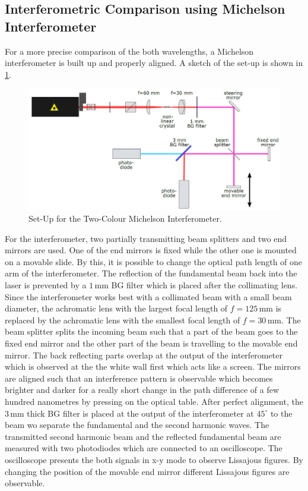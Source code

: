 \documentclass[10pt, a4paper, notitlepage, DIV=15]{scrartcl}
\begin{document}
\subsection{Interferometric Comparison using Michelson Interferometer}
For a more precise comparison of the both wavelengths, a Michelson interferometer is built up and properly aligned. A sketch of the set-up is shown in \ref{fig:michelson}.
\begin{figure}[h]
	\centering
	\includegraphics[width=1.05\textwidth]{michelson}
	\caption{Set-Up for the Two-Colour Michelson Interferometer. \cite{description}}
	\label{fig:michelson}
\end{figure}
\newline
For the interferometer, two partially transmitting beam splitters and two end mirrors are used. One of the end mirrors is fixed while the other one is mounted on a movable slide. By this, it is possible to change the optical path length of one arm of the interferometer. The reflection of the fundamental beam back into the laser is prevented by a $1\,$mm  BG filter which is placed after the collimating lens. Since the interferometer works best with a collimated beam with a small beam diameter, the achromatic lens with the largest focal length of $f=125\,$mm is replaced by the achromatic lens with the smallest focal length of $f=30\,$mm. The beam splitter splits the incoming beam such that a part of the beam goes to the fixed end mirror and the other part of the beam is travelling to the movable end mirror. The back reflecting parts overlap at the output of the interferometer which is observed at the the white wall first which acts like a screen. The mirrors are aligned such that an interference pattern is observable which becomes brighter and darker for a really short change in the path difference of a few hundred nanometres by pressing on the optical table. After perfect alignment, the $3\,$mm thick BG filter is placed at the output of the interferometer at $45^\circ$ to the beam wo separate the fundamental and the second harmonic waves. The transmitted second harmonic beam and the reflected fundamental beam are measured with two photodiodes which are connected to an oscilloscope. The oscilloscope presents the both signals in x-y mode to observe Lissajous figures. By changing the position of the movable end mirror different Lissajous figures are observable.
\end{document}
